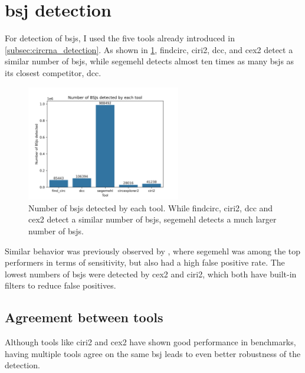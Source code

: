 \section{\Acrfull{bsj} detection}

For detection of \glspl{bsj}, I used the five tools already introduced in
\cref{subsec:circrna_detection}.
As shown in \cref{fig:detection_bars}, \gls{findcirc}, \gls{ciri2}, \gls{dcc},
and \gls{cex2} detect a similar number of \glspl{bsj}, while segemehl detects
almost ten times as many \glspl{bsj} as its closest competitor, \gls{dcc}.

\begin{figure}[H] \centering

    \includegraphics[width=0.6\textwidth]{chapters/4_results_and_discussion/figures/detection/n_bsjs_detected.png}
    \caption{Number of \glspl{bsj} detected by each tool.
        While \gls{findcirc}, \gls{ciri2}, \gls{dcc} and \gls{cex2} detect a similar
        number of \glspl{bsj}, segemehl detects a much larger number of \glspl{bsj}.
    }
    \label{fig:detection_bars}
\end{figure}
Similar behavior was previously observed by \textcite{zeng_comprehensive_2017},
where segemehl was among the top performers in terms of sensitivity, but also
had a high false positive rate.
The lowest numbers of \glspl{bsj} were detected by \gls{cex2} and \gls{ciri2},
which both have built-in filters to reduce false
positives\supercite{zhang_diverse_2016,gao_circular_2018}.

\subsection{Agreement between tools}

Although tools like \gls{ciri2} and \gls{cex2} have shown good performance in
benchmarks\supercite{zeng_comprehensive_2017}, having multiple tools agree on
the same \gls{bsj} leads to even better robustness of the
detection\supercite{hansen_comparison_2016}.

